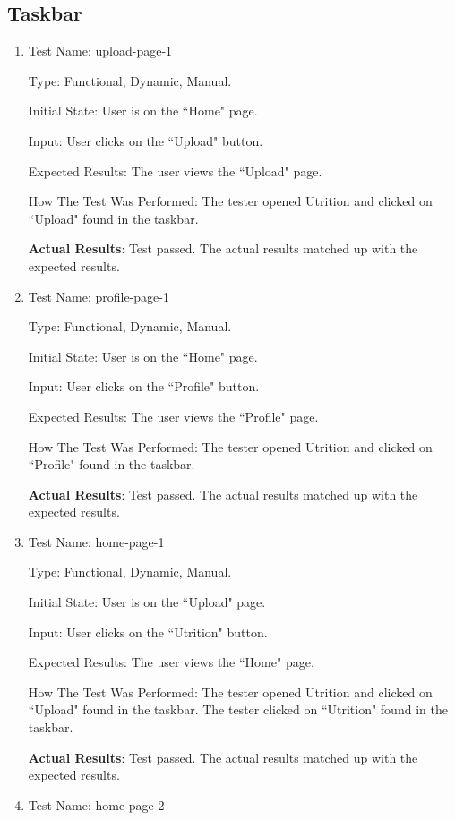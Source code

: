 \documentclass[12pt, titlepage]{article}
\begin{document}
	\subsection{Taskbar}
	\begin{enumerate}
		\item{Test Name: upload-page-1}
		
		Type: Functional, Dynamic, Manual.
		
		Initial State: User is on the ``Home" page.
		
		Input: User clicks on the ``Upload" button.
		
		Expected Results: The user views the ``Upload" page.
		
		How The Test Was Performed: The tester opened Utrition and clicked on ``Upload" found in the taskbar.
		
		\textbf{Actual Results}: Test passed. The actual results matched up with the expected results.
		
		\item{Test Name: profile-page-1}
		
		Type: Functional, Dynamic, Manual.
		
		Initial State: User is on the ``Home" page.
		
		Input: User clicks on the ``Profile" button.
		
		Expected Results: The user views the ``Profile" page.
		
		How The Test Was Performed: The tester opened Utrition and clicked on ``Profile" found in the taskbar.
		
		\textbf{Actual Results}: Test passed. The actual results matched up with the expected results.
		
		\item{Test Name: home-page-1}
		
		Type: Functional, Dynamic, Manual.
		
		Initial State: User is on the ``Upload" page.
		
		Input: User clicks on the ``Utrition" button.
		
		Expected Results: The user views the ``Home" page.
		
		How The Test Was Performed: The tester opened Utrition and clicked on ``Upload" found in the taskbar. The tester clicked on ``Utrition" found in the taskbar.
		
		\textbf{Actual Results}: Test passed. The actual results matched up with the expected results.
		
		\item{Test Name: home-page-2}
		

\end{enumerate}
\end{document}
